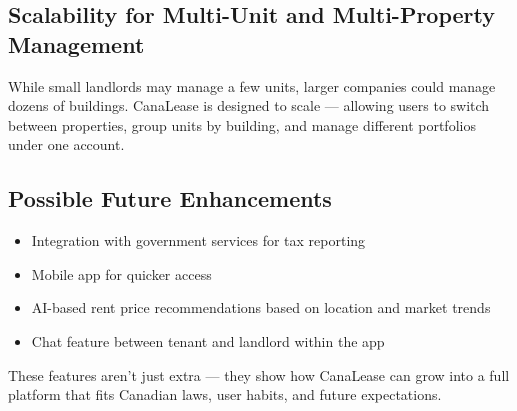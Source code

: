 \documentclass[12pt]{article}
\begin{document}
\subsection{Scalability for Multi-Unit and Multi-Property Management}
While small landlords may manage a few units, larger companies could manage dozens of buildings. CanaLease is designed to scale — allowing users to switch between properties, group units by building, and manage different portfolios under one account.

\subsection{Possible Future Enhancements}
\begin{itemize}
    \item Integration with government services for tax reporting
    \item Mobile app for quicker access
    \item AI-based rent price recommendations based on location and market trends
    \item Chat feature between tenant and landlord within the app
\end{itemize}

These features aren’t just extra — they show how CanaLease can grow into a full platform that fits Canadian laws, user habits, and future expectations.
\end{document}
